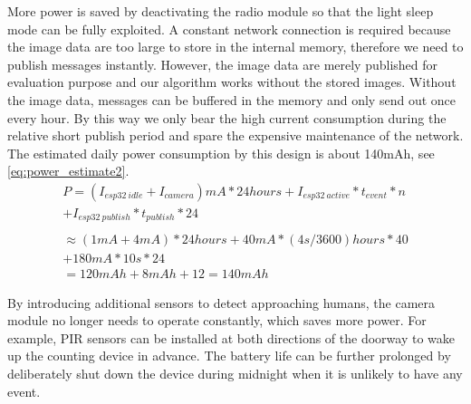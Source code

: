 More power is saved by deactivating the radio module so that the light sleep mode can be fully exploited. A constant network connection is required because the image data are too large to store in the internal memory, therefore we need to publish messages instantly. However, the image data are merely published for evaluation purpose and our algorithm works without the stored images. Without the image data, messages can be buffered in the memory and only send out once every hour. By this way we only bear the high current consumption during the relative short publish period and spare the expensive maintenance of the network. The estimated daily power consumption by this design is about 140mAh, see \autoref{eq:power_estimate2}. 
\begin{equation}\label{eq:power_estimate2}
\begin{split}
  P = (I_{esp32\ idle}+I_{camera})mA * 24 hours + I_{esp32\ active}* t_{event} *n \\+ I_{esp32\ publish}*t_{publish}*24\\ 
  \\\approx (1mA+ 4mA) * 24 hours + 40mA * (4s/3600) hours * 40 \\+ 180mA * 10s * 24
  \\= 120mAh +  8mAh + 12 = 140mAh
\end{split}
\end{equation}

By introducing additional sensors to detect approaching humans, the camera module no longer needs to operate constantly, which saves more power. For example, PIR sensors can be installed at both directions of the doorway to wake up the counting device in advance.   
The battery life can be further prolonged by deliberately shut down the device during midnight when it is unlikely to have any event.

